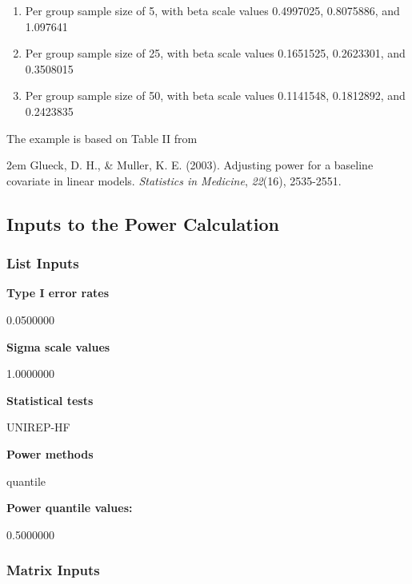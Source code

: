 \documentclass{glimmpse-report}
\begin{document}
\begin{enumerate}\item Per group sample size of 5, with beta scale values 0.4997025, 0.8075886, and 1.097641\item Per group sample size of 25, with beta scale values 0.1651525, 0.2623301, and 0.3508015\item Per group sample size of 50, with beta scale values 0.1141548,  0.1812892, and  0.2423835
\end{enumerate}

The example is based on Table II from

\hangindent2em
 Glueck, D. H., \& Muller, K. E. (2003). Adjusting power for a baseline covariate in linear models. \emph{Statistics in Medicine}, \emph{22}(16), 2535-2551.


\subsection{Inputs to the Power Calculation}
\subsubsection{List Inputs}

{\bf Type I error rates}

0.0500000

{\bf Sigma scale values}

1.0000000

{\bf Statistical tests}

UNIREP-HF

{\bf Power methods}

quantile

{\bf Power quantile values:}

0.5000000

\subsubsection{Matrix Inputs}
\end{document}
